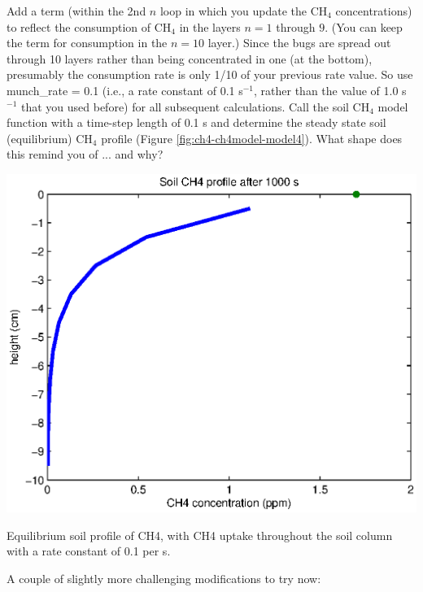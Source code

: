 \documentclass{tufte-book} %
\begin{document}
Add a term (within the 2nd \(n\) loop in which you update the CH\(_{4}\) concentrations) to reflect the consumption of CH\(_{4}\) in the layers \(n=1\) through \(9\). (You can keep the term for consumption in the \(n=10\) layer.) Since the bugs are spread out through 10 layers rather than being concentrated in one (at the bottom), presumably the consumption rate is only 1/10 of your previous rate value. So use munch\_rate = 0.1 (i.e., a rate constant of 0.1 s\(^{-1}\), rather than the value of 1.0 s\(^{-1}\) that you used before) for all subsequent calculations. Call the soil CH\(_{4}\) model function with a time-step length of 0.1 s and determine the steady state soil (equilibrium) CH\(_{4}\) profile (Figure \ref{fig:ch4-ch4model-model4}). What shape does this remind you of ... and why? 

\begin{marginfigure}[-0.0in]
\includegraphics[width=\linewidth]{ch4-ch4model-model4.eps}
\caption{Equilibrium soil profile of CH4, with CH4 uptake throughout the soil column with a rate constant of 0.1 per s.}
\label{fig:ch4-ch4model-model4}
\end{marginfigure}

A couple of slightly more challenging modifications to try now:
\end{document}
